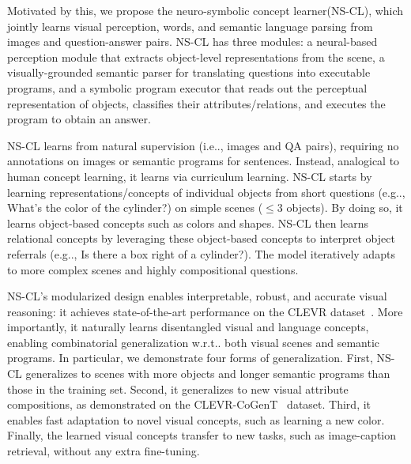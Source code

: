 \documentclass{article} %
\makeatletter
\DeclareRobustCommand\onedot{\futurelet\@let@token\@onedot}
\def\@onedot{\ifx\@let@token.\else.\null\fi\xspace}
\def\eg{e.g\onedot} \def\Eg{E.g\onedot}
\def\ie{i.e\onedot} \def\Ie{I.e\onedot}
\def\wrt{w.r.t\onedot} \def\dof{d.o.f\onedot}
\newcommand{\modelfull}{neuro-symbolic concept learner\xspace}
\newcommand{\model}{NS-CL\xspace}
\makeatother
\begin{document}
%

%
%

%

Motivated by this, we propose the \modelfull (\model), which jointly learns visual perception, words, and semantic language parsing from images and question-answer pairs. \model has three modules: a neural-based perception module that extracts object-level representations from the scene, a visually-grounded semantic parser for translating questions into executable programs, %
%
and a symbolic program executor that reads out the perceptual representation of objects, classifies their attributes/relations, and executes the program to obtain an answer.
%
%

\model learns from natural supervision (\ie, images and QA pairs), requiring no annotations on images or semantic programs for sentences. Instead, analogical to human concept learning, it learns via curriculum learning. \model starts by learning representations/concepts of individual objects from short questions (\eg, What's the color of the cylinder?) on simple scenes ($\leq$3 objects). By doing so, it learns object-based concepts such as colors and shapes. \model then learns relational concepts by leveraging these object-based concepts to interpret object referrals (\eg, Is there a box right of a cylinder?). The model iteratively adapts to more complex scenes and highly compositional questions. %
%
%

%

%

\model's modularized design enables interpretable, robust, and accurate visual reasoning: it achieves state-of-the-art performance on the CLEVR dataset~\citep{Johnson2017CLEVR}. More importantly, it naturally learns disentangled visual and language concepts, enabling combinatorial generalization \wrt both visual scenes and semantic programs. %
%
%
%
%
%
%
%
%
%
%
%
In particular, we demonstrate four forms of generalization. First, \model generalizes to scenes with more objects and longer semantic programs than those in the training set. Second, it generalizes to new visual attribute compositions, as demonstrated on the CLEVR-CoGenT~\citep{Johnson2017CLEVR} dataset. Third, it enables fast adaptation to novel visual concepts, such as learning a new color. Finally, the learned visual concepts transfer to new tasks, such as image-caption retrieval, without any extra fine-tuning.

%
%
%
\end{document}
